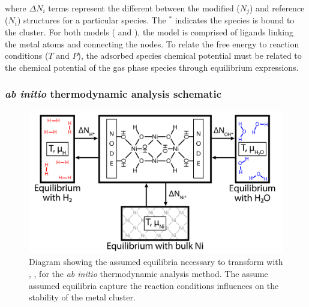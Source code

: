 \documentclass[12pt]{article}
\begin{document}
where $\Delta N_{i}$ terms represent the different between the modified ($N_{j}$) and reference ($N_{i}$) structures for a particular species. The $^{*}$ indicates the species is bound to the cluster. For both models ( and ), the model is comprised of  ligands linking the metal atoms and connecting the  nodes. To relate the free energy to reaction conditions ($T$ and $P$), the adsorbed species chemical potential must be related to the chemical potential of the gas phase species through equilibrium expressions. \\ 

\subsubsection{\textit{ab initio} thermodynamic analysis schematic}
\begin{figure}[H]
    \centering
    \includegraphics{zi-images/00-General-Graphics/FPT-schematic-full.png}
    \caption{Diagram showing the assumed equilibria necessary to transform with , ,  for the \textit{ab initio} thermodynamic analysis method. The assume assumed equilibria capture the reaction conditions influences on the stability of the metal cluster.}
    \label{fig:FPT-process-diagram}
\end{figure}
\end{document}
